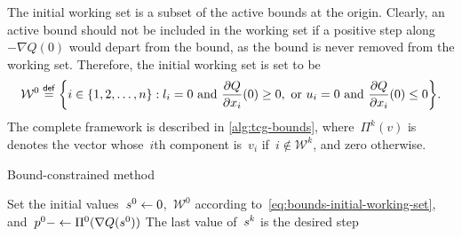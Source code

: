 The initial working set is a subset of the active bounds at the origin.
Clearly, an active bound should not be included in the working set if a positive step along~$-\nabla Q(0)$ would depart from the bound, as the bound is never removed from the working set.
Therefore, the initial working set is set to be
\begin{equation}
    \label{eq:bounds-initial-working-set}
    \mathcal{W}^0 \eqdef \set[\bigg]{i \in \set{1, 2, \dots, n} : \xl_i = 0 ~ \text{and} ~ \frac{\partial Q}{\partial \iter_i}(0) \ge 0, ~ \text{or} ~ \xu_i = 0 ~ \text{and} ~ \frac{\partial Q}{\partial \iter_i}(0) \le 0}.
\end{equation}
The complete framework is described in \cref{alg:tcg-bounds}, where~$\Pi^k(v)$ is denotes the vector whose~$i$th component is~$v_i$ if~$i \notin \mathcal{W}^k$, and zero otherwise.

\begin{algorithm}
    \caption{Bound-constrained  method}
    \label{alg:tcg-bounds}
    \DontPrintSemicolon
    \onehalfspacing
    Set the initial values~$\sstep[0] \gets 0$,~$\mathcal{W}^0$ according to~\cref{eq:bounds-initial-working-set}, and~$\pstep[0] -\gets \Pi^0(\nabla Q(\sstep[0]))$\;
    The last value of~$\sstep[k]$ is the desired step\;
\end{algorithm}

